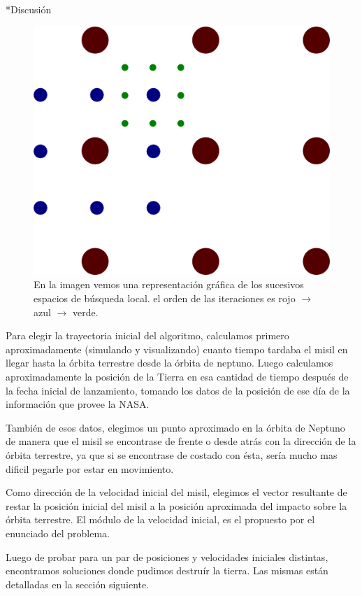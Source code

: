 \documentclass[12pt,titlepage]{article}
\newenvironment{usection}[1]{\newpage\begin{section}*{#1}	\addcontentsline{toc}{section}{#1}}{\end{section}}
\begin{document}
\begin{usection}{Discusión}
		\begin{figure}[H]
			\centering
			\includegraphics[scale=0.5]{img/grid.png}
			\caption{
				En la imagen vemos una representación gráfica de los
				sucesivos espacios de búsqueda local. el orden de las
				iteraciones es rojo $\rightarrow$ azul
				$\rightarrow$ verde.
			}
			\label{fig:grilla}
		\end{figure}		

		Para elegir la trayectoria inicial del algoritmo, calculamos
		primero aproximadamente (simulando y visualizando) cuanto
		tiempo tardaba el misil en llegar hasta la órbita terrestre
		desde la órbita de neptuno. Luego calculamos aproximadamente
		la posición de la Tierra en esa cantidad de tiempo después de la
		fecha inicial de lanzamiento, tomando los datos de la posición
		de ese día de la información que provee la NASA.

		También de esos datos, elegimos un punto aproximado en la
		órbita de Neptuno de manera que el misil se encontrase de frente
		o desde atrás con la dirección de la órbita terrestre, ya que si
		se encontrase de costado con ésta, sería mucho mas dificil
		pegarle por estar en movimiento.

		Como dirección de la velocidad inicial del misil, elegimos el
		vector resultante de restar la posición inicial del misil a la
		posición aproximada del impacto sobre la órbita terrestre.
		El módulo de la velocidad inicial, es el propuesto por el
		enunciado del problema.

		Luego de probar para un par de posiciones y velocidades
		iniciales distintas, encontramos soluciones donde pudimos
		destruír la tierra. Las mismas están detalladas en la sección
		siguiente.

		
	\end{usection}
	
\end{document}
